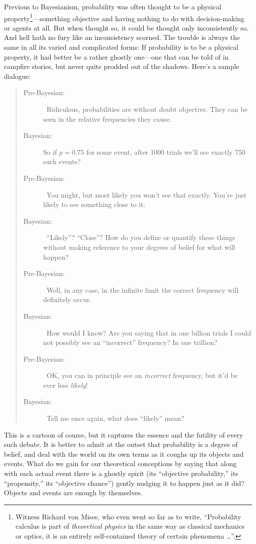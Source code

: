 \documentclass[aps,pra,superscriptaddress,12pt,tightenlines,nofootinbib]{revtex4-2}
\begin{document}
Previous to  Bayesianism, probability was often thought to be a physical property\footnote{Witness Richard von Mises, who even went so far as to write, ``Probability calculus is part of {\it theoretical physics\/} in the same way as classical mechanics or optics, it is an entirely self-contained theory of certain phenomena \ldots''\cite{Mises22}.}---something objective and having nothing to do with decision-making or agents at all.  But when thought so, it could be thought only inconsistently so.  And hell hath no fury like an inconsistency scorned.
The trouble is always the same in all its varied and complicated forms:  If probability is to be a physical property, it had better be a rather ghostly one---one that can be told of in campfire stories, but never quite prodded out of the shadows.  Here's a sample dialogue:
\begin{quote}
\begin{description}

\item[Pre-Bayesian:]  \ Ridiculous, probabilities are without doubt objective.  They can be seen in the relative frequencies they cause.
\item[Bayesian:]  So if $p=0.75$ for some event, after 1000 trials we'll see exactly 750 such events?
\item[Pre-Bayesian:]  \ You might, but most likely you won't see that exactly.  You're just likely to see something close to it.
\item[Bayesian:]  \ ``Likely''?  ``Close''?  How do you define or quantify these things without making reference to your degrees of belief for what will happen?
\item[Pre-Bayesian:]  \ Well, in any case, in the infinite limit the correct frequency will definitely occur.
\item[Bayesian:]  \ How would I know?  Are you saying that in one billion trials I could not possibly see an ``incorrect'' frequency?  In one trillion?
\item[Pre-Bayesian:]  \ OK, you can in principle see an {\it incorrect\/} frequency, but it'd be ever less {\it likely}!
\item[Bayesian:]  \ Tell me once again, what does ``likely'' mean?
\end{description}
\end{quote}
This is a cartoon of course, but it captures the essence and the futility of every such debate.  It is better to admit at the outset that probability is a degree of belief, and deal with the world on its own terms as it coughs up its objects and events.  What do we gain for our theoretical conceptions by saying that along with each actual event there is a ghostly spirit (its ``objective probability,'' its ``propensity,'' its ``objective chance'') gently nudging it to happen just as it did?  Objects and events are enough by themselves.
\end{document}
